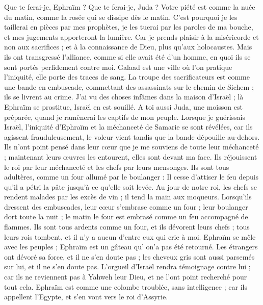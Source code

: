 \begin{multicols}{2}
Que te ferai-je, Ephraïm ? Que te ferai-je, Juda ? Votre piété est comme la nuée du matin, comme la rosée qui se dissipe dès le matin.
C'est pourquoi je les taillerai en pièces par mes prophètes, je les tuerai par les paroles de ma bouche, et mes jugements apporteront la lumière.
Car je prends plaisir à la miséricorde et non aux sacrifices ; et à la connaissance de Dieu, plus qu’aux holocaustes.
Mais ils ont transgressé l’alliance, comme si elle avait été d’un homme, en quoi ils se sont portés perfidement contre moi.
Galaad est une ville où l’on pratique l’iniquité, elle porte des traces de sang.
La troupe des sacrificateurs est comme une bande en embuscade, commettant des assassinats sur le chemin de Sichem ; ils se livrent au crime.
J'ai vu des choses infâmes dans la maison d'Israël ; là Ephraïm se prostitue, Israël en est souillé.
A toi aussi Juda, une moisson est préparée, quand je ramènerai les captifs de mon peuple.
\VerseOne{}Lorsque je guérissais Israël, l'iniquité d'Ephraïm et la méchanceté de Samarie se sont révélées, car ils agissent frauduleusement, le voleur vient tandis que la bande dépouille au-dehors.
Ils n'ont point pensé dans leur cœur que je me souviens de toute leur méchanceté ; maintenant leurs œuvres les entourent, elles sont devant ma face.
Ils réjouissent le roi par leur méchanceté et les chefs par leurs mensonges.
Ils sont tous adultères, comme un four allumé par le boulanger : Il cesse d’attiser le feu depuis qu’il a pétri la pâte jusqu'à ce qu'elle soit levée.
Au jour de notre roi, les chefs se rendent malades par les excès de vin ; il tend la main aux moqueurs.
Lorsqu’ils dressent des embuscades, leur cœur s’embrase comme un four ; leur boulanger dort toute la nuit ; le matin le four est embrasé comme un feu accompagné de flammes.
Ils sont tous ardents comme un four, et ils dévorent leurs chefs ; tous leurs rois tombent, et il n'y a aucun d'entre eux qui crie à moi.
Ephraïm se mêle avec les peuples ; Ephraïm est un gâteau qu' on'a pas été retourné.
Les étrangers ont dévoré sa force, et il ne s’en doute pas ; les cheveux gris sont aussi parsemés sur lui, et il ne s’en doute pas.
L'orgueil d'Israël rendra témoignage contre lui ; car ils ne reviennent pas à Yahweh leur Dieu, et ne l'ont point recherché pour tout cela. 
Ephraïm est comme une colombe troublée, sans intelligence ; car ils appellent l'Egypte, et s’en vont vers le roi d'Assyrie.

\end{multicols}
